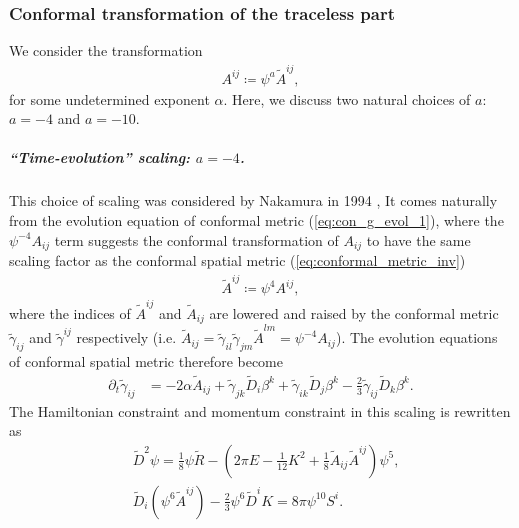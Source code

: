 \subsubsection{Conformal transformation of the traceless part}
\label{section1.3.2.2}
We consider the transformation
\begin{align}
    A^{ij} \coloneqq \psi^a \tilde{A}^{ij},
\end{align}
for some undetermined exponent $\alpha$.
Here, we discuss two natural choices of $a$: $a = -4$ and $a = -10$.

\subparagraph{“Time-evolution” scaling: $a=-4$.}
This choice of scaling was considered by Nakamura in 1994 \cite{nakamura19943d},
It comes naturally from the evolution equation of conformal metric (\ref{eq:con_g_evol_1}),
where the $\psi^{-4}A_{ij}$ term suggests the conformal transformation of $A_{ij}$ to have the same scaling factor as the conformal spatial metric (\ref{eq:conformal_metric_inv})
\begin{align}
    \tilde{A}^{ij} \coloneqq \psi^4 A^{ij},
\end{align}
where the indices of $\tilde{A}^{ij}$ and $\tilde{A}_{ij}$ are lowered and raised by the conformal metric $\tilde{\gamma}_{ij}$ and $\tilde{\gamma}^{ij}$ respectively
(i.e. $\tilde{A}_{ij} = \tilde{\gamma}_{il}\tilde{\gamma}_{jm}\tilde{A}^{lm} = \psi^{-4} A_{ij}$).
The evolution equations of conformal spatial metric therefore become
\begin{align}
    \partial_t \tilde{\gamma}_{ij} &= - 2\alpha \tilde{A}_{ij} + \tilde{\gamma}_{jk} \tilde{D}_i \beta^k + \tilde{\gamma}_{ik} \tilde{D}_j \beta^k - \frac{2}{3} \tilde{\gamma}_{ij} \tilde{D}_k \beta^k.
\end{align}
The Hamiltonian constraint and momentum constraint in this scaling is rewritten as
\begin{align}
    &\tilde{D}^2 \psi = \frac{1}{8} \psi \tilde{R} - \left( 2 \pi E - \frac{1}{12}K^2 + \frac{1}{8} \tilde{A}_{ij} \tilde{A}^{ij} \right) \psi^5, 
    \label{eq:H_const_s4}\\
    &\tilde{D}_i \left(\psi^6 \tilde{A}^{ij} \right) - \frac{2}{3}\psi^6 \tilde{D}^i K = 8\pi \psi^{10} S^i.\label{eq:S_const_s4}
\end{align}

